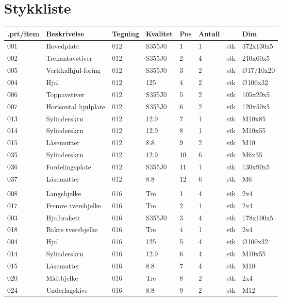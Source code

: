 \chapter{Stykkliste}
\begin{tabular}{|l|l|l|l|l|l|l|l|}
\hline
\bf{.prt/item} & \bf{Beskrivelse} & \bf{Tegning} & \bf{Kvalitet} & \bf{Pos} & \bf{Antall} &  & \bf{Dim}\\ \hline
001 & Hovedplate & 012 & S355J0 & 1 & 1 & stk & 372x130x5\\ \hline
002 & Trekantavstiver & 012 & S355J0 & 2 & 4 & stk & 210x60x5\\ \hline
005 & Vertikalhjul-foring & 012 & S355J0 & 3 & 2 & stk & Ø17/10x20\\ \hline
004 & Hjul & 012 & 125 & 4 & 2 & stk & Ø100x32\\ \hline
006 & Toppavstiver & 012 & S355J0 & 5 & 2 & stk & 105x20x5\\ \hline
007 & Horisontal hjulplate & 012 & S355J0 & 6 & 2 & stk & 120x50x5\\ \hline
013 & Sylinderskru & 012 & 12.9 & 7 & 1 & stk & M10x85\\ \hline
014 & Sylinderskru & 012 & 12.9 & 8 & 1 & stk & M10x55\\ \hline
015 & Låsemutter & 012 & 8.8 & 9 & 2 & stk & M10\\ \hline
035 & Sylinderskru & 012 & 12.9 & 10 & 6 & stk & M6x35\\ \hline
036 & Fordelingsplate & 012 & S355J0 & 11 & 1 & stk & 130x90x5\\ \hline
037 & Låsemutter & 012 & 8.8 & 12 & 6 & stk & M6\\ \hline
 &  &  &  &  &  &  & \\ \hline
008 & Langsbjelke & 016 & Tre & 1 & 4 & stk & 2x4\\ \hline
017 & Fremre tversbjelke & 016 & Tre & 2 & 1 & stk & 2x4\\ \hline
003 & Hjulbrakett & 016 & S355J0 & 3 & 4 & stk & 178x100x5\\ \hline
018 & Bakre tversbjelke & 016 & Tre & 4 & 1 & stk & 2x4\\ \hline
004 & Hjul & 016 & 125 & 5 & 4 & stk & Ø100x32\\ \hline
014 & Sylinderskru & 016 & 12.9 & 6 & 4 & stk & M10x55\\ \hline
015 & Låsemutter & 016 & 8.8 & 7 & 4 & stk & M10\\ \hline
020 & Midtbjelke & 016 & Tre & 8 & 2 & stk & 2x4\\ \hline
024 & Underlagskive & 016 & 8.8 & 9 & 2 & stk & M12\\ \hline

\end{tabular}
